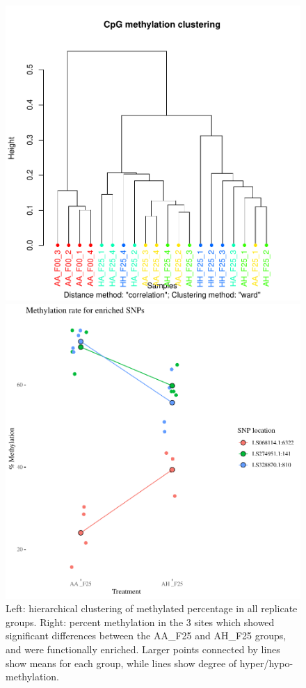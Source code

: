 \documentclass[11pt]{scrartcl}
\begin{document}
\begin{figure}
  \centering
  \begin{minipage}{.45\linewidth}
    \includegraphics[width=\linewidth]{hclust}
  \end{minipage}
  \begin{minipage}{.45\linewidth}
    \includegraphics[width=\linewidth]{snp-diff}
  \end{minipage}
  \caption{{\footnotesize Left: hierarchical clustering of methylated percentage in
      all replicate groups. Right: percent methylation in the 3 sites
      which showed significant differences between the AA\_F25 and
      AH\_F25 groups, and were functionally enriched. Larger points
      connected by lines show means for each group, while lines show
      degree of hyper/hypo-methylation.}}
  \label{fig:1}
\end{figure}
\end{document}
